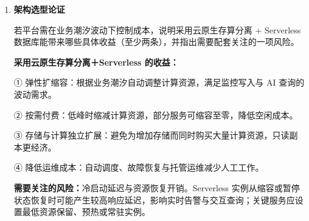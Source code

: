 \documentclass[UTF8,a4paper,11pt]{ctexart}
\newenvironment{answer}%
  {\begin{ans}\noindent{\bfseries\color{ansframe}【答案】}\hspace{0.4em}}%
  {\end{ans}}
\begin{document}
\begin{enumerate}
\begin{enumerate}
\item \textbf{架构选型论证}\par
若平台需在业务潮汐波动下控制成本，说明采用云原生存算分离 + Serverless 数据库能带来哪些具体收益（至少两条），并指出需要配套关注的一项风险。
\begin{answer}
\textbf{采用云原生存算分离＋Serverless 的收益：}\par
① 弹性扩缩容：根据业务潮汐自动调整计算资源，满足监控写入与 AI 查询的波动需求。\par
② 按需付费：低峰时缩减计算资源，部分服务可缩容至零，降低空闲成本。\par
③ 存储与计算独立扩展：避免为增加存储而同时购买大量计算资源，只读副本更经济。\par
④ 降低运维成本：自动调度、故障恢复与托管运维减少人工工作。\par
\textbf{需要关注的风险：}冷启动延迟与资源恢复开销。Serverless 实例从缩容或暂停状态恢复时可能产生较高响应延迟，影响实时告警与交互查询；关键服务应设置最低资源保留、预热或常驻实例。
\end{answer}
\end{enumerate}

\end{enumerate}
\end{document}

